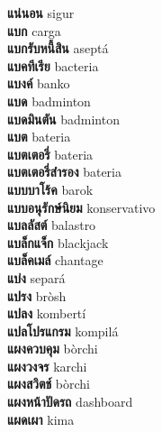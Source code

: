 \textbf{ แน่นอน  } sigur \\
\textbf{ แบก  } carga \\
\textbf{ แบกรับหนี้สิน  } aseptá \\
\textbf{ แบคทีเรีย  } bacteria \\
\textbf{ แบงค์  } banko \\
\textbf{ แบด  } badminton \\
\textbf{ แบดมินตัน  } badminton \\
\textbf{ แบต  } bateria \\
\textbf{ แบตเตอรี่  } bateria \\
\textbf{ แบตเตอรี่สำรอง  } bateria \\
\textbf{ แบบบาโร้ค  } barok \\
\textbf{ แบบอนุรักษ์นิยม  } konservativo \\
\textbf{ แบลลัสต์  } balastro \\
\textbf{ แบล็กแจ็ก  } blackjack \\
\textbf{ แบล็คเมล์  } chantage \\
\textbf{ แบ่ง  } separá \\
\textbf{ แปรง  } bròsh \\
\textbf{ แปลง  } kombertí \\
\textbf{ แปลโปรแกรม  } kompilá \\
\textbf{ แผงควบคุม  } bòrchi \\
\textbf{ แผงวงจร  } karchi \\
\textbf{ แผงสวิตช์  } bòrchi \\
\textbf{ แผงหน้าปัดรถ  } dashboard \\
\textbf{ แผดเผา  } kima \\
